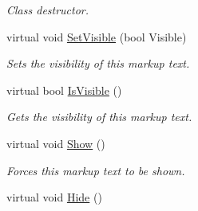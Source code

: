 \begin{DoxyCompactItemize}
\begin{DoxyCompactList}\small\item\em Class destructor. \item\end{DoxyCompactList}\item 
virtual void \hyperlink{classphys_1_1UI_1_1MarkupText_ac5c38c21af2fbc3533697cacfec8fdc3}{SetVisible} (bool Visible)
\begin{DoxyCompactList}\small\item\em Sets the visibility of this markup text. \item\end{DoxyCompactList}\item 
virtual bool \hyperlink{classphys_1_1UI_1_1MarkupText_a17873359c7387926c7e759665ad4312d}{IsVisible} ()
\begin{DoxyCompactList}\small\item\em Gets the visibility of this markup text. \item\end{DoxyCompactList}\item 
\hypertarget{classphys_1_1UI_1_1MarkupText_a223df1155960fd6a4ddde7a43e87fa09}{
virtual void \hyperlink{classphys_1_1UI_1_1MarkupText_a223df1155960fd6a4ddde7a43e87fa09}{Show} ()}
\label{classphys_1_1UI_1_1MarkupText_a223df1155960fd6a4ddde7a43e87fa09}

\begin{DoxyCompactList}\small\item\em Forces this markup text to be shown. \item\end{DoxyCompactList}\item 
\hypertarget{classphys_1_1UI_1_1MarkupText_ad0a4b1d27341426d08d367c4891c23f9}{
virtual void \hyperlink{classphys_1_1UI_1_1MarkupText_ad0a4b1d27341426d08d367c4891c23f9}{Hide} ()}
\label{classphys_1_1UI_1_1MarkupText_ad0a4b1d27341426d08d367c4891c23f9}


\end{DoxyCompactItemize}
